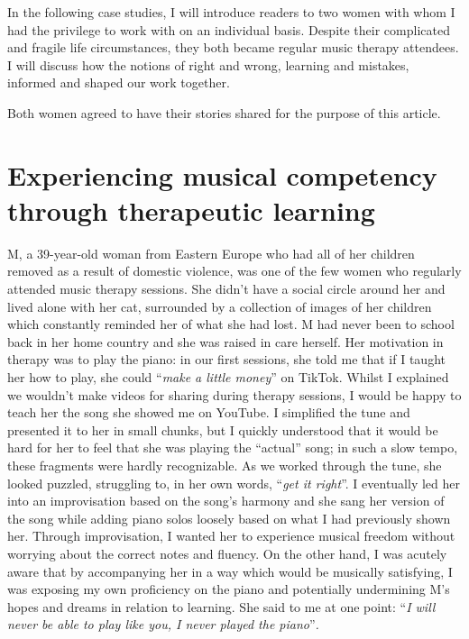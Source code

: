 \documentclass[authordate, empirical, issue]{jote-new-article}
\begin{document}
In the following case studies, I will introduce readers to two women with whom I had the privilege to work with on an individual basis. Despite their complicated and fragile life circumstances, they both became regular music therapy attendees. I will discuss how the notions of right and wrong, learning and mistakes, informed and shaped our work together.



Both women agreed to have their stories shared for the purpose of this article.







\section{Experiencing musical competency through therapeutic learning}







M, a 39-year-old woman from Eastern Europe who had all of her children removed as a result of domestic violence, was one of the few women who regularly attended music therapy sessions. She didn't have a social circle around her and lived alone with her cat, surrounded by a collection of images of her children which constantly reminded her of what she had lost. M had never been to school back in her home country and she was raised in care herself. Her motivation in therapy was to play the piano: in our first sessions, she told me that if I taught her how to play, she could “\emph{make a little money}” on TikTok. Whilst I explained we wouldn't make videos for sharing during therapy sessions, I would be happy to teach her the song she showed me on YouTube. I simplified the tune and presented it to her in small chunks, but I quickly understood that it would be hard for her to feel that she was playing the “actual” song; in such a slow tempo, these fragments were hardly recognizable. As we worked through the tune, she looked puzzled, struggling to, in her own words, “\emph{get it right}”. I eventually led her into an improvisation based on the song's harmony and she sang her version of the song while adding piano solos loosely based on what I had previously shown her. Through improvisation, I wanted her to experience musical freedom without worrying about the correct notes and fluency. On the other hand, I was acutely aware that by accompanying her in a way which would be musically satisfying, I was exposing my own proficiency on the piano and potentially undermining M's hopes and dreams in relation to learning. She said to me at one point: “\emph{I will never be able to play like you, I never played the piano}”\emph{.}
\end{document}
